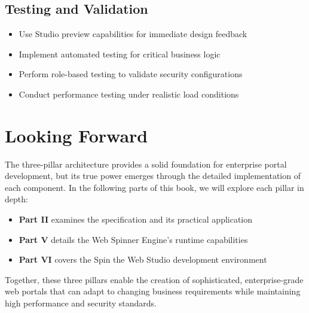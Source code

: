 \subsection{Testing and Validation}

\begin{itemize}
    \item Use Studio preview capabilities for immediate design feedback
    \item Implement automated testing for critical business logic
    \item Perform role-based testing to validate security configurations
    \item Conduct performance testing under realistic load conditions
\end{itemize}

\section{Looking Forward}
\label{sec:architecture-forward}

The three-pillar architecture provides a solid foundation for enterprise portal development, but its true power emerges through the detailed implementation of each component. In the following parts of this book, we will explore each pillar in depth:

\begin{itemize}
    \item \textbf{Part II} examines the \wbdl{} specification and its practical application
    \item \textbf{Part V} details the Web Spinner Engine's runtime capabilities
    \item \textbf{Part VI} covers the Spin the Web Studio development environment
\end{itemize}

Together, these three pillars enable the creation of sophisticated, enterprise-grade web portals that can adapt to changing business requirements while maintaining high performance and security standards.
